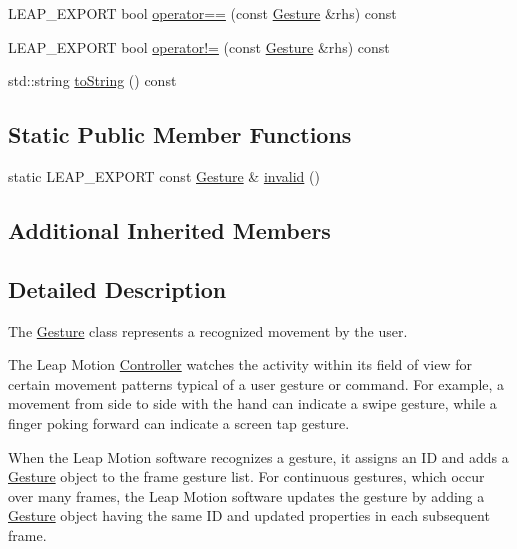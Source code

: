 \begin{DoxyCompactItemize}
\item 
L\+E\+A\+P\+\_\+\+E\+X\+P\+O\+RT bool \hyperlink{class_leap_1_1_gesture_a73c6d6763eb9c9ad44262e368ea6eedc}{operator==} (const \hyperlink{class_leap_1_1_gesture}{Gesture} \&rhs) const
\item 
L\+E\+A\+P\+\_\+\+E\+X\+P\+O\+RT bool \hyperlink{class_leap_1_1_gesture_a025bb8bc32d63de8a97406d947cec5d6}{operator!=} (const \hyperlink{class_leap_1_1_gesture}{Gesture} \&rhs) const
\item 
std\+::string \hyperlink{class_leap_1_1_gesture_a076e8d5632d6526acdc14daf6b3e6b2b}{to\+String} () const
\end{DoxyCompactItemize}
\subsection*{Static Public Member Functions}
\begin{DoxyCompactItemize}
\item 
static L\+E\+A\+P\+\_\+\+E\+X\+P\+O\+RT const \hyperlink{class_leap_1_1_gesture}{Gesture} \& \hyperlink{class_leap_1_1_gesture_a76cbf3abfeb8c1b4fb6faed4483bb185}{invalid} ()
\end{DoxyCompactItemize}
\subsection*{Additional Inherited Members}


\subsection{Detailed Description}
The \hyperlink{class_leap_1_1_gesture}{Gesture} class represents a recognized movement by the user.

The Leap Motion \hyperlink{class_leap_1_1_controller}{Controller} watches the activity within its field of view for certain movement patterns typical of a user gesture or command. For example, a movement from side to side with the hand can indicate a swipe gesture, while a finger poking forward can indicate a screen tap gesture.

When the Leap Motion software recognizes a gesture, it assigns an ID and adds a \hyperlink{class_leap_1_1_gesture}{Gesture} object to the frame gesture list. For continuous gestures, which occur over many frames, the Leap Motion software updates the gesture by adding a \hyperlink{class_leap_1_1_gesture}{Gesture} object having the same ID and updated properties in each subsequent frame.

